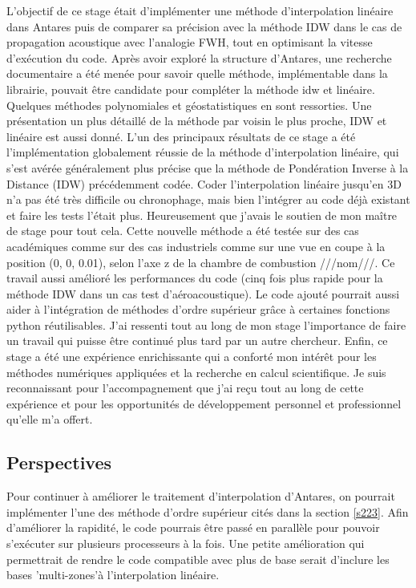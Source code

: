 L'objectif de ce stage était d'implémenter une méthode d'interpolation linéaire dans Antares puis de comparer sa précision avec la méthode IDW dans le cas de propagation acoustique avec l'analogie FWH, tout en optimisant la vitesse d'exécution du code.
Après avoir exploré la structure d'Antares, une recherche documentaire a été menée pour savoir quelle méthode, implémentable dans la librairie, pouvait être candidate pour compléter la méthode idw et linéaire. Quelques méthodes polynomiales et géostatistiques en sont ressorties. Une présentation un plus détaillé de la méthode par voisin le plus proche, IDW et linéaire est aussi donné.
L'un des principaux résultats de ce stage a été l'implémentation globalement réussie de la méthode d'interpolation linéaire, qui s'est avérée généralement plus précise que la méthode de Pondération Inverse à la Distance (IDW) précédemment codée.
Coder l'interpolation linéaire jusqu'en 3D n'a pas été très difficile ou chronophage, mais bien l'intégrer au code déjà existant et faire les tests l'était plus. Heureusement que j'avais le soutien de mon maître de stage pour tout cela.
Cette nouvelle méthode a été testée sur des cas académiques comme sur des cas industriels comme sur une vue en coupe à la position (0, 0, 0.01), selon l'axe z de la chambre de combustion ///nom///.
Ce travail aussi amélioré les performances du code (cinq fois plus rapide pour la méthode IDW dans un cas test d'aéroacoustique).
Le code ajouté pourrait aussi aider à l'intégration de méthodes d'ordre supérieur grâce à certaines fonctions python réutilisables.
J'ai ressenti tout au long de mon stage l'importance de faire un travail qui puisse être continué plus tard par un autre chercheur.
Enfin, ce stage a été une expérience enrichissante qui a conforté mon intérêt pour les méthodes numériques appliquées et la recherche en calcul scientifique. Je suis reconnaissant pour l'accompagnement que j'ai reçu tout au long de cette expérience et pour les opportunités de développement personnel et professionnel qu'elle m'a offert.

\subsection*{Perspectives}
Pour continuer à améliorer le traitement d'interpolation d'Antares, on pourrait implémenter l'une des méthode d'ordre supérieur cités dans la section \ref{s223}.
Afin d'améliorer la rapidité, le code pourrais être passé en parallèle pour pouvoir s’exécuter sur plusieurs processeurs à la fois.
Une petite amélioration qui permettrait de rendre le code compatible avec plus de base serait d'inclure les bases 'multi-zones'à l'interpolation linéaire.


